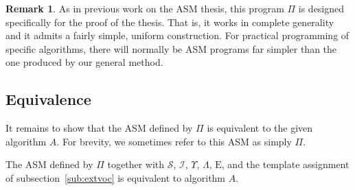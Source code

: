 \documentclass{LMCS}
\theoremstyle{definition}
\newtheorem{rmk}[thm]{Remark}
\newcommand{\E}{\mathrm{E}}
\newcommand{\U}{\Upsilon}
\newcommand{\scr}[1]{\ensuremath{\mathcal {#1}}}
\begin{document}
\begin{rmk}
  As in previous work on the ASM thesis, this program $\Pi$ is
  designed specifically for the proof of the thesis.  That is, it
  works in complete generality and it admits a fairly simple, uniform
  construction.  For practical programming of specific algorithms,
  there will normally be ASM programs far simpler than the one
  produced by our general method.
\end{rmk}

\subsection{Equivalence}

It remains to show that the ASM defined by $\Pi$ is equivalent to the
given algorithm $A$.  For brevity, we sometimes refer to this ASM as
simply $\Pi$.

\begin{thm}   \label{main-thm}
The ASM defined by $\Pi$ together with  \scr S, \scr I,
  $\U$, $\Lambda$, $\E$, and the template assignment of
  subsection~\ref{sub:extvoc} is equivalent to algorithm $A$.
\end{thm}
\end{document}
